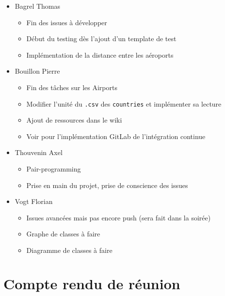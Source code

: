 \documentclass[a4paper, 12pt]{report}
\begin{document}
\begin{itemize}
\item
  Bagrel Thomas

  \begin{itemize}
  
  \item
    Fin des issues à développer
  \item
    Début du testing dès l'ajout d'un template de test
  \item
    Implémentation de la distance entre les aéroports
  \end{itemize}
\item
  Bouillon Pierre

  \begin{itemize}
  
  \item
    Fin des tâches sur les Airports
  \item
    Modifier l'unité du \texttt{.csv} des \texttt{countries} et
    implémenter sa lecture
  \item
    Ajout de ressources dans le wiki
  \item
    Voir pour l'implémentation GitLab de l'intégration continue
  \end{itemize}
\item
  Thouvenin Axel

  \begin{itemize}
  
  \item
    Pair-programming
  \item
    Prise en main du projet, prise de conscience des issues
  \end{itemize}
\item
  Vogt Florian

  \begin{itemize}
  
  \item
    Issues avancées mais pas encore push (sera fait dans la soirée)
  \item
    Graphe de classes à faire
  \item
    Diagramme de classes à faire
  \end{itemize}
\end{itemize}


\section{Compte rendu de réunion }
\end{document}
